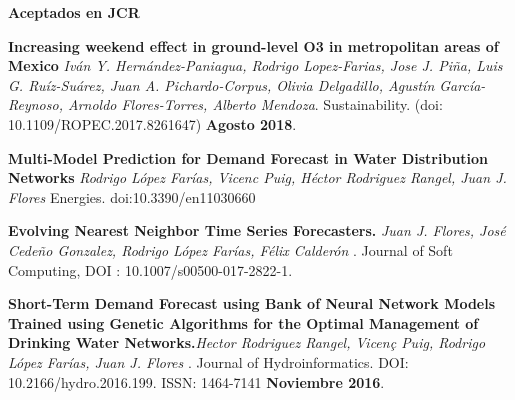 \documentclass[10pt]{article}
\newenvironment{innerlist}[1][\enskip\textbullet]%
        {\begin{compactitem}[#1]}{\end{compactitem}}
\begin{document}
\textbf{Aceptados en JCR}

\begin{innerlist}

\item \textbf{Increasing weekend effect in ground-level O3 in metropolitan areas of Mexico} \textit{Iván Y. Hernández-Paniagua, Rodrigo Lopez-Farias, Jose J. Piña, Luis G. Ruíz-Suárez, Juan A. Pichardo-Corpus, Olivia Delgadillo, Agustín García-Reynoso, Arnoldo Flores-Torres, Alberto Mendoza}. {Sustainability}. (doi: 10.1109/ROPEC.2017.8261647) \textbf{Agosto 2018}.

\item \textbf{Multi-Model Prediction for Demand Forecast in
Water Distribution Networks} \textit{Rodrigo López Farías, Vicenc Puig, Héctor Rodriguez Rangel, Juan J. Flores} {Energies}. doi:10.3390/en11030660

\item  \textbf{Evolving Nearest Neighbor Time Series Forecasters.} \textit{Juan J. Flores, José Cede\~no Gonzalez, Rodrigo López Farías, Félix Calderón }.  {Journal of Soft Computing},
DOI : 10.1007/s00500-017-2822-1.

\item \textbf{Short-Term Demand Forecast using Bank of Neural Network Models Trained using Genetic Algorithms for the Optimal Management of Drinking Water Networks.}\textit{Hector Rodriguez Rangel, Vicen\c{c} Puig, Rodrigo López Farías, Juan J. Flores }.  {Journal of Hydroinformatics}. DOI: 10.2166/hydro.2016.199. ISSN: 1464-7141 \textbf{Noviembre 2016}.





\end{innerlist}
\end{document}
